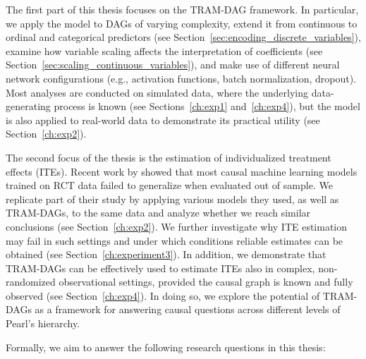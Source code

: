 The first part of this thesis focuses on the TRAM-DAG framework. In particular, we apply the model to DAGs of varying complexity, extend it from continuous to ordinal and categorical predictors (see Section~\ref{sec:encoding_discrete_variables}), examine how variable scaling affects the interpretation of coefficients (see Section~\ref{sec:scaling_continuous_variables}), and make use of different neural network configurations (e.g., activation functions, batch normalization, dropout). Most analyses are conducted on simulated data, where the underlying data-generating process is known (see Sections~\ref{ch:exp1} and~\ref{ch:exp4}), but the model is also applied to real-world data to demonstrate its practical utility (see Section~\ref{ch:exp2}).

The second focus of the thesis is the estimation of individualized treatment effects (ITEs). Recent work by \citet{chen2025} showed that most causal machine learning models trained on RCT data failed to generalize when evaluated out of sample. We replicate part of their study by applying various models they used, as well as TRAM-DAGs, to the same data and analyze whether we reach similar conclusions (see Section~\ref{ch:exp2}). We further investigate why ITE estimation may fail in such settings and under which conditions reliable estimates can be obtained (see Section~\ref{ch:experiment3}). In addition, we demonstrate that TRAM-DAGs can be effectively used to estimate ITEs also in complex, non-randomized observational settings, provided the causal graph is known and fully observed (see Section~\ref{ch:exp4}). In doing so, we explore the potential of TRAM-DAGs as a framework for answering causal questions across different levels of Pearl's hierarchy.

\medskip

Formally, we aim to answer the following research questions in this thesis:

